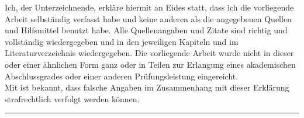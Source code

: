 
Ich, der Unterzeichnende, erkläre hiermit an Eides statt, dass ich die vorliegende Arbeit
selbständig verfasst habe und keine anderen als die angegebenen Quellen und Hilfsmittel benutzt
habe. Alle Quellenangaben und Zitate sind richtig und vollständig wiedergegeben und in den
jeweiligen Kapiteln und im Literaturverzeichnis wiedergegeben. Die vorliegende Arbeit wurde nicht in
dieser oder einer ähnlichen Form ganz oder in Teilen zur Erlangung eines akademischen
Abschlussgrades oder einer anderen Prüfungsleistung eingereicht.\\
Mit ist bekannt, dass falsche Angaben im Zusammenhang mit dieser Erklärung strafrechtlich verfolgt
werden können.
\vspace{3cm}

\noindent{} \hspace{4cm} 
\hrule